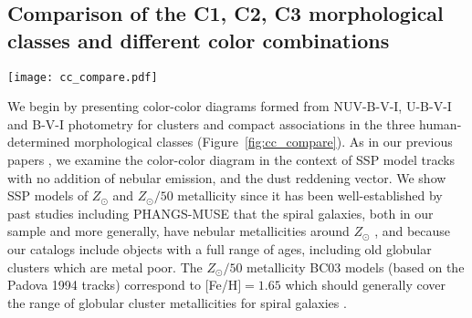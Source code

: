 \documentclass[linenumbers]{aastex63}
\begin{document}
\subsection{Comparison of the C1, C2, C3 morphological classes and different color combinations}\label{ssect:cc_overview}
%
\begin{figure*} 
\texttt{[image: cc\_compare.pdf]}
 \caption{Color-color diagrams for the PHANGS-HST human classified sample, with each morphological class shown separately: C1 single-peaked symmetric clusters (left column); C2 single-peaked asymmetric clusters (middle column); and C3 multi-peaked compact associations (right column). In all panels V-I is plotted along the horizontal axis, and three other colors are shown along the vertical axis: NUV-B (top row), U-B (middle row) and B-V (bottom row).  We only show data points for clusters which are detected with at least a ${\rm S/N > 3}$ in the plotted bands. 
 Individual clusters are represented by black dots whereas in crowded regions we show a Gaussian-smoothed heat map indicating the relative density. 
 The size of the smoothing kernel is shown by a red circle on the top middle panel.
 A cyan track denotes the  SSP model for ${\rm Z_{\odot}}$ metallicity at ages from 1\,Myr till 13.7\,Gyr. The portion of the SSP track ${\rm Z_{\odot}/50}$ metallicity from 0.5-13.7\,Gyr is also shown with a magenta track. Key ages are indicated on the right column and are marked with blue and pink dots on each track.  A reddening vector (top right of each panel) corresponds to ${\rm A_v = 1.0 mag}$. In panel d), we indicate names for relevant loci in the color-color space.}
 \label{fig:cc_compare}
\end{figure*}
%
We begin by presenting color-color diagrams formed from NUV-B-V-I, U-B-V-I and B-V-I photometry for clusters and compact associations in the three human-determined morphological classes (Figure~\ref{fig:cc_compare}).  As in our previous papers \citep[e.g.,][]{turner_phangs-hst_2021,lee_phangs-hst_2022,deger_bright_2022}, we examine the color-color diagram in the context of   SSP model tracks with no addition of nebular emission, and the dust reddening vector.  We show SSP models of $Z_{\odot}$ and $Z_{\odot}/50$ metallicity since it has been well-established by past studies including PHANGS-MUSE that the spiral galaxies, both in our sample and more generally, have nebular metallicities around $Z_{\odot}$ \citep[e.g.,][]{zkh94, skillman_virgo_96, moustakas10, groves_phangs-muse_2023, scheuermann_stellar_2023}, and because our catalogs include objects with a full range of ages, including old globular clusters which are metal poor. The $Z_{\odot}/50$ metallicity BC03 models (based on the Padova 1994 tracks) correspond to $[$Fe/H$]=1.65$ which should generally cover the range of globular cluster metallicities for spiral galaxies \citep[][and references therein]{BS06}. 
\end{document}
